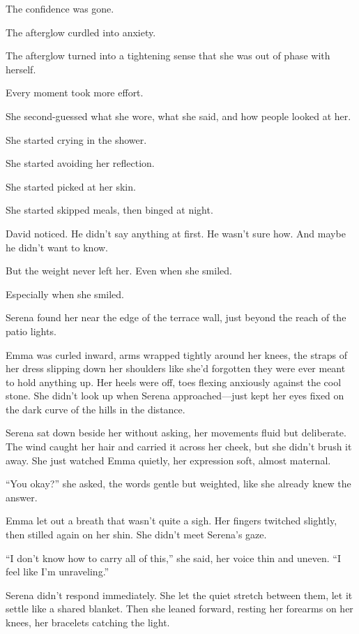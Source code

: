 The confidence was gone.

The afterglow curdled into anxiety. 

The afterglow turned into a tightening sense that she was 
out of phase with herself. 

Every moment took more effort. 

She second-guessed what she wore, what she said, and how people looked at her. 

She started crying in the shower. 

She started avoiding her reflection. 

She started picked at her skin. 

She started skipped meals, then binged at night. 

David noticed. He didn’t say anything at first. He wasn’t sure how. And maybe he didn’t want to know. 

But the weight never left her. Even when she smiled.

Especially when she smiled.

Serena found her near the edge of the terrace wall, just beyond the reach of the patio lights. 

Emma was curled inward, arms wrapped tightly around her knees, the straps of her dress slipping down her shoulders 
like she’d forgotten they were ever meant to hold anything up. Her heels were off, toes flexing anxiously 
against the cool stone. She didn’t look up when Serena approached—just kept her eyes fixed on the dark 
curve of the hills in the distance.

Serena sat down beside her without asking, her movements fluid but deliberate. The wind caught her hair 
and carried it across her cheek, but she didn’t brush it away. She just watched Emma quietly, her expression 
soft, almost maternal.

``You okay?'' she asked, the words gentle but weighted, like she already knew the answer.

Emma let out a breath that wasn’t quite a sigh. Her fingers twitched slightly, then stilled again on her 
shin. She didn’t meet Serena’s gaze.

``I don’t know how to carry all of this,'' she said, her voice thin and uneven. ``I feel like I’m unraveling.''

Serena didn’t respond immediately. She let the quiet stretch between them, let it settle like a shared 
blanket. Then she leaned forward, resting her forearms on her knees, her bracelets catching the light.

